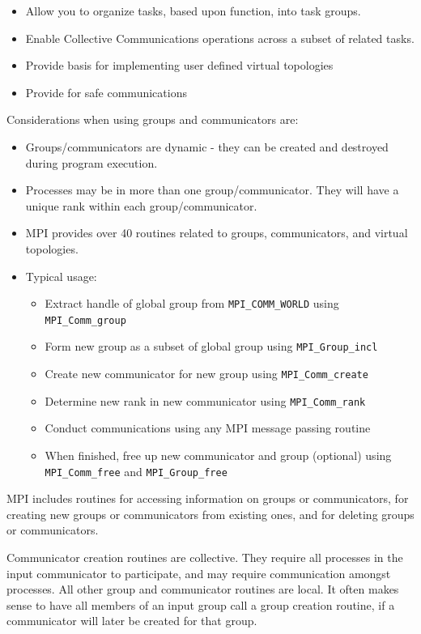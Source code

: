 \begin{itemize}
\item Allow you to organize tasks, based upon function, into task groups.  
\item Enable Collective Communications operations across a subset of related tasks.  
\item Provide basis for implementing user defined virtual topologies  
\item Provide for safe communications  
\end{itemize}

Considerations when using groups and communicators are:
\begin{itemize}
\item Groups/communicators are dynamic - they can be created and destroyed during program execution.  
\item Processes may be in more than one group/communicator. They will have a unique rank within each group/communicator.  
\item MPI provides over 40 routines related to groups, communicators, and virtual topologies.  
\item Typical usage:  \begin{itemize}
  \item Extract handle of global group from \texttt{MPI\_COMM\_WORLD} using \texttt{MPI\_Comm\_group}  
  \item Form new group as a subset of global group using \texttt{MPI\_Group\_incl}  
  \item Create new communicator for new group using \texttt{MPI\_Comm\_create}  
  \item Determine new rank in new communicator using \texttt{MPI\_Comm\_rank}  
  \item Conduct communications using any MPI message passing routine  
  \item When finished, free up new communicator and group (optional) using \texttt{MPI\_Comm\_free} and \texttt{MPI\_Group\_free}  
\end{itemize}
\end{itemize}

MPI includes routines for accessing information on groups or communicators, for creating new groups or communicators from existing ones, and for deleting groups or communicators. 

Communicator creation routines are collective. They require all processes in the input  communicator  to  participate,  and  may  require  communication  amongst processes.  All  other  group  and  communicator  routines  are  local.  It often makes sense to have all members of an input group call a group creation routine, if a communicator will later be created for that group.

